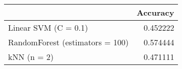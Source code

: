 \begin{tabular}{lr}
\toprule
{} &  Accuracy \\
\midrule
Linear SVM (C = 0.1)            &  0.452222 \\
RandomForest (estimators = 100) &  0.574444 \\
kNN (n = 2)                     &  0.471111 \\
\bottomrule
\end{tabular}
